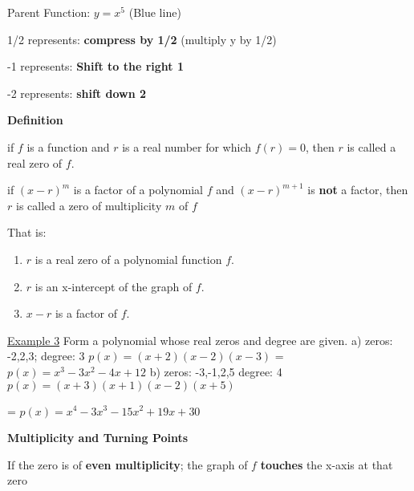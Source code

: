 \documentclass{report}
\begin{document}

  Parent Function: $y = x^5$ (Blue line)

  1/2 represents: \textbf{compress by 1/2} (multiply y by 1/2)

  -1 represents: \textbf{Shift to the right 1}
  
  -2 represents: \textbf{shift down 2}

  \bigbreak \bigbreak

  \begin{Large}
    \noindent \textbf{Definition}
  \end{Large} 
  
  \bigbreak \noindent
  if $f$ is a function and $r$ is a real number for which $f(r) = 0$, then $r$ is called a real zero of $f$.

  \noindent if $(x-r)^m$ is a factor of a polynomial $f$ and $(x-r)^{m+1}$ is \textbf{not} a factor, then $r$ is called a zero of multiplicity $m$ of $f$

  \bigbreak

  \noindent That is:
  \begin{enumerate}

  \item $r$ is a real zero of a polynomial function $f$.
  \item $r$ is an x-intercept of the graph of $f$.
  \item $x-r$ is a factor of $f$.

  \end{enumerate}
  
  \bigbreak \bigbreak
  \noindent \underline{Example 3}
  Form a polynomial whose real zeros and degree are given.
  \bigbreak
  \noindent a) zeros: -2,2,3; degree: 3
  \bigbreak
  $p(x) = (x+2)(x-2)(x-3)$
  \bigbreak
  = $p(x) = x^3-3x^2-4x+12$
  \bigbreak \bigbreak
  \noindent b) zeros: -3,-1,2,5 degree: 4
  \bigbreak 
  $p(x) = (x+3)(x+1)(x-2)(x+5)$
  
  = $p(x) = x^4-3x^3-15x^2+19x+30$ 
  \bigbreak \bigbreak \noindent
  \begin{Large}

    \noindent \textbf{Multiplicity and Turning Points}
    
  \end{Large}
  \bigbreak 
  \noindent If the zero is of \textbf{even multiplicity}; the graph of $f$ \textbf{touches} the x-axis at that zero
  
\end{document}
